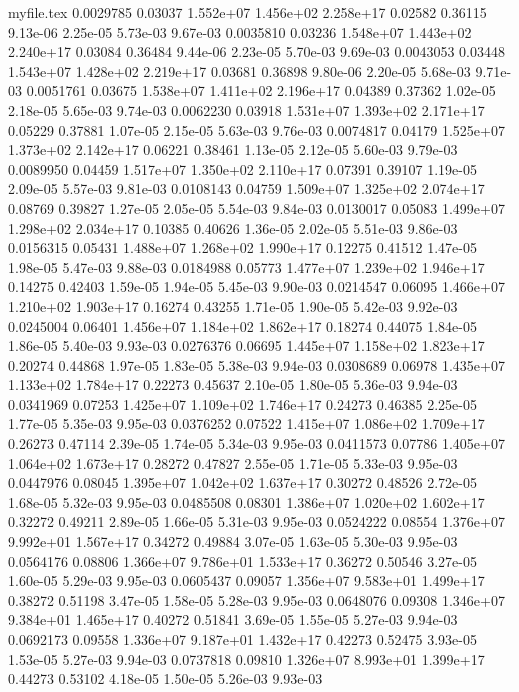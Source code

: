 \begin{filecontents}{myfile.tex}
0.0029785 0.03037 1.552e+07 1.456e+02 2.258e+17 0.02582 0.36115 9.13e-06 2.25e-05 5.73e-03 9.67e-03
0.0035810 0.03236 1.548e+07 1.443e+02 2.240e+17 0.03084 0.36484 9.44e-06 2.23e-05 5.70e-03 9.69e-03
0.0043053 0.03448 1.543e+07 1.428e+02 2.219e+17 0.03681 0.36898 9.80e-06 2.20e-05 5.68e-03 9.71e-03
0.0051761 0.03675 1.538e+07 1.411e+02 2.196e+17 0.04389 0.37362 1.02e-05 2.18e-05 5.65e-03 9.74e-03
0.0062230 0.03918 1.531e+07 1.393e+02 2.171e+17 0.05229 0.37881 1.07e-05 2.15e-05 5.63e-03 9.76e-03
0.0074817 0.04179 1.525e+07 1.373e+02 2.142e+17 0.06221 0.38461 1.13e-05 2.12e-05 5.60e-03 9.79e-03
0.0089950 0.04459 1.517e+07 1.350e+02 2.110e+17 0.07391 0.39107 1.19e-05 2.09e-05 5.57e-03 9.81e-03
0.0108143 0.04759 1.509e+07 1.325e+02 2.074e+17 0.08769 0.39827 1.27e-05 2.05e-05 5.54e-03 9.84e-03
0.0130017 0.05083 1.499e+07 1.298e+02 2.034e+17 0.10385 0.40626 1.36e-05 2.02e-05 5.51e-03 9.86e-03
0.0156315 0.05431 1.488e+07 1.268e+02 1.990e+17 0.12275 0.41512 1.47e-05 1.98e-05 5.47e-03 9.88e-03
0.0184988 0.05773 1.477e+07 1.239e+02 1.946e+17 0.14275 0.42403 1.59e-05 1.94e-05 5.45e-03 9.90e-03
0.0214547 0.06095 1.466e+07 1.210e+02 1.903e+17 0.16274 0.43255 1.71e-05 1.90e-05 5.42e-03 9.92e-03
0.0245004 0.06401 1.456e+07 1.184e+02 1.862e+17 0.18274 0.44075 1.84e-05 1.86e-05 5.40e-03 9.93e-03
0.0276376 0.06695 1.445e+07 1.158e+02 1.823e+17 0.20274 0.44868 1.97e-05 1.83e-05 5.38e-03 9.94e-03
0.0308689 0.06978 1.435e+07 1.133e+02 1.784e+17 0.22273 0.45637 2.10e-05 1.80e-05 5.36e-03 9.94e-03
0.0341969 0.07253 1.425e+07 1.109e+02 1.746e+17 0.24273 0.46385 2.25e-05 1.77e-05 5.35e-03 9.95e-03
0.0376252 0.07522 1.415e+07 1.086e+02 1.709e+17 0.26273 0.47114 2.39e-05 1.74e-05 5.34e-03 9.95e-03
0.0411573 0.07786 1.405e+07 1.064e+02 1.673e+17 0.28272 0.47827 2.55e-05 1.71e-05 5.33e-03 9.95e-03
0.0447976 0.08045 1.395e+07 1.042e+02 1.637e+17 0.30272 0.48526 2.72e-05 1.68e-05 5.32e-03 9.95e-03
0.0485508 0.08301 1.386e+07 1.020e+02 1.602e+17 0.32272 0.49211 2.89e-05 1.66e-05 5.31e-03 9.95e-03
0.0524222 0.08554 1.376e+07 9.992e+01 1.567e+17 0.34272 0.49884 3.07e-05 1.63e-05 5.30e-03 9.95e-03
0.0564176 0.08806 1.366e+07 9.786e+01 1.533e+17 0.36272 0.50546 3.27e-05 1.60e-05 5.29e-03 9.95e-03
0.0605437 0.09057 1.356e+07 9.583e+01 1.499e+17 0.38272 0.51198 3.47e-05 1.58e-05 5.28e-03 9.95e-03
0.0648076 0.09308 1.346e+07 9.384e+01 1.465e+17 0.40272 0.51841 3.69e-05 1.55e-05 5.27e-03 9.94e-03
0.0692173 0.09558 1.336e+07 9.187e+01 1.432e+17 0.42273 0.52475 3.93e-05 1.53e-05 5.27e-03 9.94e-03
0.0737818 0.09810 1.326e+07 8.993e+01 1.399e+17 0.44273 0.53102 4.18e-05 1.50e-05 5.26e-03 9.93e-03

\end{filecontents}
